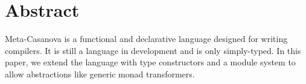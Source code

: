 \section*{Abstract}
Meta-Casanova is a functional and declarative language designed for writing compilers. 
It is still a language in development and is only simply-typed.
In this paper, we extend the language with type constructors and a module system to allow abstractions like generic monad transformers.
